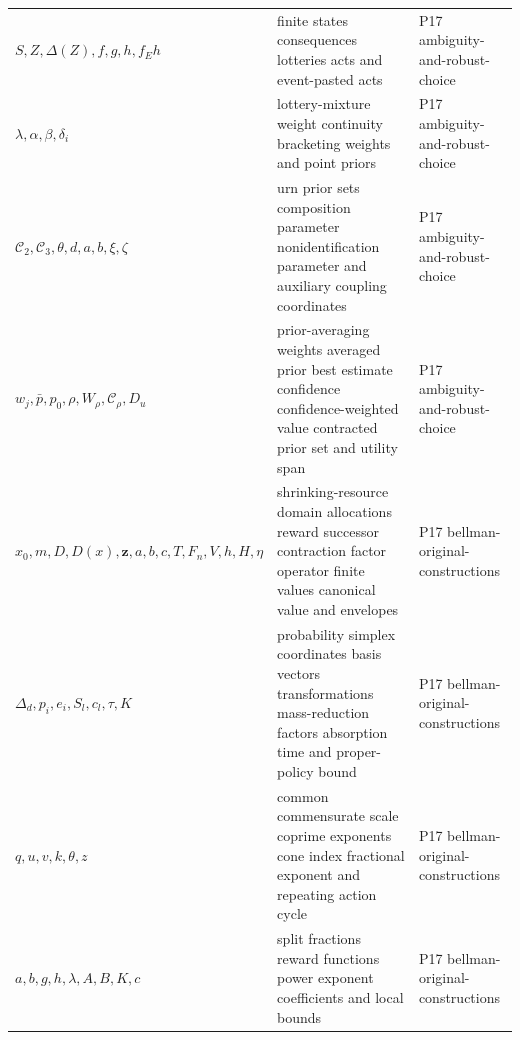 \begin{longtable}{@{}p{}p{}p{}@{}}
\(S,\allowbreak Z,\allowbreak \Delta(Z),\allowbreak f,\allowbreak g,\allowbreak h,\allowbreak f_Eh\) & finite states consequences lotteries acts and event-pasted acts & P17 ambiguity-\allowbreak{}and-\allowbreak{}robust-\allowbreak{}choice \\
\(\lambda,\allowbreak \alpha,\allowbreak \beta,\allowbreak \delta_i\) & lottery-mixture weight continuity bracketing weights and point priors & P17 ambiguity-\allowbreak{}and-\allowbreak{}robust-\allowbreak{}choice \\
\(\mathcal C_2,\allowbreak \mathcal C_3,\allowbreak \theta,\allowbreak d,\allowbreak a,\allowbreak b,\allowbreak \xi,\allowbreak \zeta\) & urn prior sets composition parameter nonidentification parameter and auxiliary coupling coordinates & P17 ambiguity-\allowbreak{}and-\allowbreak{}robust-\allowbreak{}choice \\
\(w_j,\allowbreak \bar p,\allowbreak p_0,\allowbreak \rho,\allowbreak W_\rho,\allowbreak \mathcal C_\rho,\allowbreak D_u\) & prior-averaging weights averaged prior best estimate confidence confidence-weighted value contracted prior set and utility span & P17 ambiguity-\allowbreak{}and-\allowbreak{}robust-\allowbreak{}choice \\
\(x_0,\allowbreak m,\allowbreak D,\allowbreak D(x),\allowbreak \mathbf z,\allowbreak a,\allowbreak b,\allowbreak c,\allowbreak T,\allowbreak F_n,\allowbreak V,\allowbreak h,\allowbreak H,\allowbreak \eta\) & shrinking-resource domain allocations reward successor contraction factor operator finite values canonical value and envelopes & P17 bellman-\allowbreak{}original-\allowbreak{}constructions \\
\(\Delta_d,\allowbreak p_i,\allowbreak e_i,\allowbreak S_l,\allowbreak c_l,\allowbreak \tau,\allowbreak K\) & probability simplex coordinates basis vectors transformations mass-reduction factors absorption time and proper-policy bound & P17 bellman-\allowbreak{}original-\allowbreak{}constructions \\
\(q,\allowbreak u,\allowbreak v,\allowbreak k,\allowbreak \theta,\allowbreak z\) & common commensurate scale coprime exponents cone index fractional exponent and repeating action cycle & P17 bellman-\allowbreak{}original-\allowbreak{}constructions \\
\(a,\allowbreak b,\allowbreak g,\allowbreak h,\allowbreak \lambda,\allowbreak A,\allowbreak B,\allowbreak K,\allowbreak c\) & split fractions reward functions power exponent coefficients and local bounds & P17 bellman-\allowbreak{}original-\allowbreak{}constructions \\

\end{longtable}
